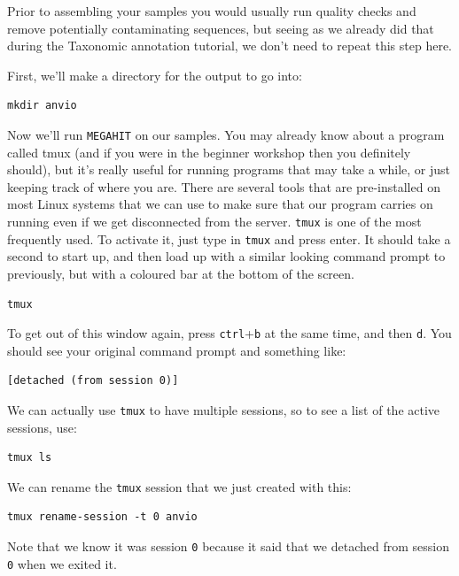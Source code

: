 \documentclass[
]{book}
\begin{document}
Prior to assembling your samples you would usually run quality checks and remove potentially contaminating sequences, but seeing as we already did that during the Taxonomic annotation tutorial, we don't need to repeat this step here.

First, we'll make a directory for the output to go into:

\begin{verbatim}
mkdir anvio
\end{verbatim}

Now we'll run \texttt{MEGAHIT} on our samples. You may already know about a program called tmux (and if you were in the beginner workshop then you definitely should), but it's really useful for running programs that may take a while, or just keeping track of where you are. There are several tools that are pre-installed on most Linux systems that we can use to make sure that our program carries on running even if we get disconnected from the server. \texttt{tmux} is one of the most frequently used. To activate it, just type in \texttt{tmux} and press enter. It should take a second to start up, and then load up with a similar looking command prompt to previously, but with a coloured bar at the bottom of the screen.

\begin{verbatim}
tmux
\end{verbatim}

To get out of this window again, press \texttt{ctrl}+\texttt{b} at the same time, and then \texttt{d}. You should see your original command prompt and something like:

\begin{verbatim}
[detached (from session 0)]
\end{verbatim}

We can actually use \texttt{tmux} to have multiple sessions, so to see a list of the active sessions, use:

\begin{verbatim}
tmux ls
\end{verbatim}

We can rename the \texttt{tmux} session that we just created with this:

\begin{verbatim}
tmux rename-session -t 0 anvio
\end{verbatim}

Note that we know it was session \texttt{0} because it said that we detached from session \texttt{0} when we exited it.
\end{document}
